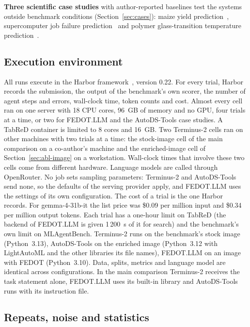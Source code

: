 \textbf{Three scientific case studies} with author-reported baselines test
the systems outside benchmark conditions (Section~\ref{sec:cases}): maize
yield prediction~\citep{kick2023yield}, supercomputer job failure
prediction~\citep{antici2025fdata} and polymer glass-transition temperature
prediction~\citep{wang2025openpoly}.

\subsection{Execution environment}
\label{sec:env}

All runs execute in the Harbor framework~\citep{harbor2026}, version 0.22.
For every trial, Harbor records the submission, the output of the benchmark's
own scorer, the number of agent steps and errors, wall-clock time, token
counts and cost. Almost every cell ran on one server with 18 CPU cores,
96~GB of memory and no GPU, four trials at a time, or two for FEDOT.LLM and
the AutoDS-Tools case studies. A TabReD container is limited to 8 cores and
16~GB. Two Terminus-2 cells ran on other machines with two trials at a time:
the stock-image cell of the main comparison on a co-author's machine and the
enriched-image cell of Section~\ref{sec:abl-image} on a workstation.
Wall-clock times that involve these two cells come from different hardware.
Language models are called through OpenRouter. No job sets sampling
parameters: Terminus-2 and AutoDS-Tools send none, so the defaults of the
serving provider apply, and FEDOT.LLM uses the settings of its own
configuration. The cost of a trial is the one Harbor records. For
gemma-4-31b-it the list price was \$0.09 per million input and
\$0.34 per million output tokens. Each trial has a one-hour limit on TabReD
(the backend of FEDOT.LLM is given 1\,200~s of it for search) and the
benchmark's own limit on MLAgentBench. Terminus-2 runs on the benchmark's
stock image (Python~3.13), AutoDS-Tools on the enriched image (Python~3.12
with LightAutoML and the other libraries its file names), FEDOT.LLM on an
image with FEDOT (Python~3.10). Data, splits, metrics and language model are
identical across configurations. In the main comparison Terminus-2 receives the task statement alone,
FEDOT.LLM uses its built-in library and AutoDS-Tools runs with its
instruction file.

\subsection{Repeats, noise and statistics}
\label{sec:stats}

